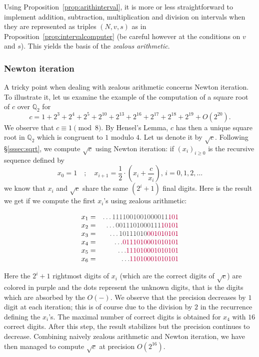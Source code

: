\documentclass[11pt]{article}
\numberwithin{equation}{section}
\numberwithin{figure}{section}
\renewcommand{\geq}{\geqslant}
\theoremstyle{definition}
\newcommand{\Q}{\mathbb Q}
\newcommand{\sage}{\textsc{SageMath}~\cite{sage}\xspace}
\newcommand{\magma}{\textsc{Magma}~\cite{magma}\xspace}
\newcommand{\pari}{\textsc{Pari}~\cite{pari}\xspace}
\begin{document}
Using Proposition~\ref{prop:arithinterval}, it is more or less 
straightforward to implement addition, subtraction, multiplication and 
division on intervals when they are represented as triples $(N,v,s)$ as 
in Proposition~\ref{prop:intervalcomputer} (be careful however at the 
conditions on $v$ and $s$). This yields the basis of the \emph{zealous
arithmetic}. %

\subsubsection{Newton iteration}
\label{sssec:intervalNewton}

A tricky point when dealing with zealous arithmetic concerns Newton
iteration. To illustrate it, let us examine the example of the
computation of a square root of $c$ over $\Q_2$ for
$$c = 1 + 2^{3} + 2^{4} + 2^{5} + 2^{10} + 2^{13} + 2^{16} + 2^{17} + 
      2^{18} + 2^{19} + O(2^{20}).$$
We observe that $c \equiv 1 \pmod 8$. By Hensel's Lemma, $c$
has then a unique square root in $\Q_2$ which is congruent to $1$ 
modulo $4$. Let us denote it by $\sqrt c$. Following \S \ref{sssec:sqrt}, 
we compute $\sqrt c$ using Newton iteration: if $(x_i)_{i \geq 0}$ is
the recursive sequence defined by
$$x_0 = 1 \quad ; \quad x_{i+1} = \frac 1 2 \cdot \left( x_i + \frac 
c{x_i}\right), \, i = 0, 1, 2, \ldots$$
we know that $x_i$ and $\sqrt c$ share the same $(2^i + 1)$ final
digits. Here is the result we get if we compute the first $x_i$'s
using zealous arithmetic:

$$\begin{array}{lr}
x_1 = & %
 {\color{black!70}\ldots1111001001000011}{\color{purple}101} \\
x_2 = & %
 {\color{black!70}\ldots0011101000111}{\color{purple}10101} \\
x_3 = & %
 {\color{black!70}\ldots10111010}{\color{purple}001010101} \\
x_4 = & %
 {\color{black!70}\ldots}{\color{purple}0111010001010101} \\
x_5 = & %
 {\color{black!70}\ldots}{\color{purple}111010001010101} \\
x_6 = & %
 {\color{black!70}\ldots}{\color{purple}11010001010101} 
\end{array}$$

\noindent
Here the $2^i{+}1$ rightmost digits of $x_i$ (which are the correct
digits of $\sqrt c$) are colored in purple and the dots represent
the unknown digits, that is the digits which are absorbed by the
$O(-)$. We observe that the precision decreases by $1$ digit at 
each iteration; this is of course due to the division by $2$ in the 
recurrence defining the $x_i$'s.
The maximal number of correct digits is obtained for $x_4$ with 
$16$ correct digits. After this step, the result stabilizes but 
the precision continues to decrease. Combining naively zealous 
arithmetic and Newton iteration, we have then managed to compute 
$\sqrt c$ at precision $O(2^{16})$.
\end{document}
